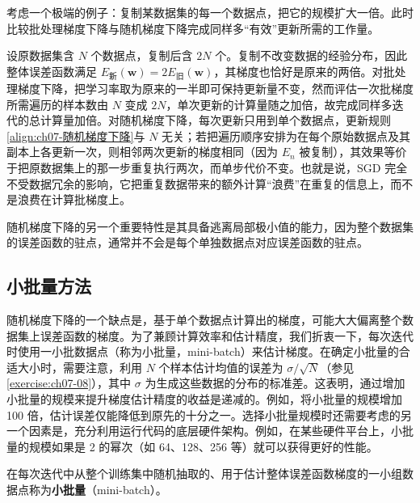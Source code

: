 \documentclass[../../main.tex]{subfiles}
\begin{document}
\begin{example}[ 数据冗余下的计算量对比]\label{example:ch07-数据冗余}
考虑一个极端的例子：复制某数据集的每一个数据点，把它的规模扩大一倍。此时比较批处理梯度下降与随机梯度下降完成同样多“有效”更新所需的工作量。
\end{example}
\begin{solution}
设原数据集含 $N$ 个数据点，复制后含 $2N$ 个。复制不改变数据的经验分布，因此整体误差函数满足 $E_{\text{新}}(\mathbf{w})=2E_{\text{旧}}(\mathbf{w})$，其梯度也恰好是原来的两倍。对批处理梯度下降，把学习率取为原来的一半即可保持更新量不变，然而评估一次批梯度所需遍历的样本数由 $N$ 变成 $2N$，单次更新的计算量随之加倍，故完成同样多迭代的总计算量加倍。对随机梯度下降，每次更新只用到单个数据点，更新规则\eqref{align:ch07-随机梯度下降}与 $N$ 无关；若把遍历顺序安排为在每个原始数据点及其副本上各更新一次，则相邻两次更新的梯度相同（因为 $E_n$ 被复制），其效果等价于把原数据集上的那一步重复执行两次，而单步代价不变。也就是说，SGD 完全不受数据冗余的影响，它把重复数据带来的额外计算“浪费”在重复的信息上，而不是浪费在计算批梯度上。
\end{solution}

随机梯度下降的另一个重要特性是其具备逃离局部极小值的能力，因为整个数据集的误差函数的驻点，通常并不会是每个单独数据点对应误差函数的驻点。

\subsection{小批量方法}\label{subsection:ch07-小批量方法}

随机梯度下降的一个缺点是，基于单个数据点计算出的梯度，可能大大偏离整个数据集上误差函数的梯度。为了兼顾计算效率和估计精度，我们折衷一下，每次迭代时使用一小批数据点（称为小批量，mini-batch）来估计梯度。在确定小批量的合适大小时，需要注意，利用 $N$ 个样本估计均值的误差为 $\sigma/\sqrt{N}$（参见\cref{exercise:ch07-08}），其中 $\sigma$ 为生成这些数据的分布的标准差。这表明，通过增加小批量的规模来提升梯度估计精度的收益是递减的。例如，将小批量的规模增加 100 倍，估计误差仅能降低到原先的十分之一。选择小批量规模时还需要考虑的另一个因素是，充分利用运行代码的底层硬件架构。例如，在某些硬件平台上，小批量的规模如果是 2 的幂次（如 64、128、256 等）就可以获得更好的性能。

\begin{definition}[小批量]\label{definition:ch07-小批量}
在每次迭代中从整个训练集中随机抽取的、用于估计整体误差函数梯度的一小组数据点称为\textbf{小批量}（mini-batch）。
\end{definition}
\end{document}
